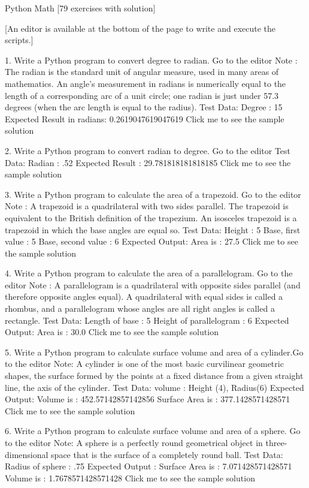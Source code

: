 
Python Math [79 exercises with solution]

[An editor is available at the bottom of the page to write and execute the scripts.]

1. Write a Python program to convert degree to radian. Go to the editor
Note : The radian is the standard unit of angular measure, used in many areas of mathematics. An angle's measurement in radians is numerically equal to the length of a corresponding arc of a unit circle; one radian is just under 57.3 degrees (when the arc length is equal to the radius).
Test Data:
Degree : 15
Expected Result in radians: 0.2619047619047619
Click me to see the sample solution

2. Write a Python program to convert radian to degree. Go to the editor 
Test Data:
Radian : .52
Expected Result : 29.781818181818185
Click me to see the sample solution

3. Write a Python program to calculate the area of a trapezoid. Go to the editor
Note : A trapezoid is a quadrilateral with two sides parallel. The trapezoid is equivalent to the British definition of the trapezium. An isosceles trapezoid is a trapezoid in which the base angles are equal so.
Test Data:
Height : 5
Base, first value : 5
Base, second value : 6
Expected Output: Area is : 27.5
Click me to see the sample solution

4. Write a Python program to calculate the area of a parallelogram. Go to the editor
Note : A parallelogram is a quadrilateral with opposite sides parallel (and therefore opposite angles equal). A quadrilateral with equal sides is called a rhombus, and a parallelogram whose angles are all right angles is called a rectangle.
Test Data: 
Length of base : 5
Height of parallelogram : 6
Expected Output: Area is : 30.0
Click me to see the sample solution

5. Write a Python program to calculate surface volume and area of a cylinder.Go to the editor 
Note: A cylinder is one of the most basic curvilinear geometric shapes, the surface formed by the points at a fixed distance from a given straight line, the axis of the cylinder.
Test Data:
volume : Height (4), Radius(6)
Expected Output:
Volume is : 452.57142857142856
Surface Area is : 377.1428571428571
Click me to see the sample solution

6. Write a Python program to calculate surface volume and area of a sphere. Go to the editor
Note: A sphere is a perfectly round geometrical object in three-dimensional space that is the surface of a completely round ball.
Test Data:
Radius of sphere : .75
Expected Output :
Surface Area is : 7.071428571428571
Volume is : 1.7678571428571428
Click me to see the sample solution

